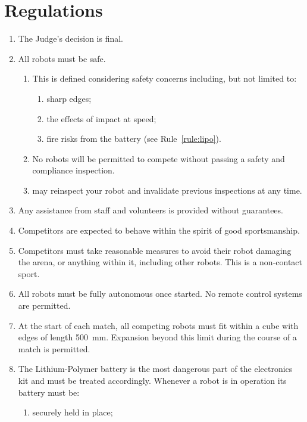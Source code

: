 \section{Regulations}
\label{sec:regs}

\begin{enumerate}
\item The Judge's decision is final.
\item All robots must be safe.
  \begin{enumerate}
    \item This is defined considering safety concerns including, but not limited
          to:
      \begin{enumerate}
        \item sharp edges;
        \item the effects of impact at speed;
        \item fire risks from the battery (see Rule~\ref{rule:lipo}).
      \end{enumerate}
    \item No robots will be permitted to compete without passing a safety and
          compliance inspection.
    \item \staff may reinspect your robot and invalidate previous inspections at
          any time.
  \end{enumerate}
\item Any assistance from \org staff and volunteers is provided without
      guarantees.
\item Competitors are expected to behave within the spirit of good
      sportsmanship.
\item Competitors must take reasonable measures to avoid their robot damaging
      the arena, or anything within it, including other robots. This is a
      non-contact sport.
\item All robots must be fully autonomous once started. No remote control
      systems are permitted.
\item At the start of each match, all competing robots must fit within a cube
      with edges of length \SI{500}{mm}. Expansion beyond this limit during the
      course of a match is permitted.
\item \label{rule:lipo}
      The Lithium-Polymer battery is the most dangerous part of the electronics
      kit and must be treated accordingly. Whenever a robot is in operation
      its battery must be:
  \begin{enumerate}
    \item securely held in place;

\end{enumerate}
\end{enumerate}

